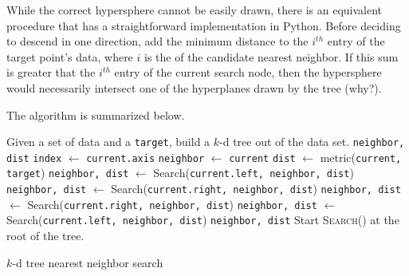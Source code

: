 While the correct hypersphere cannot be easily drawn, there is an equivalent procedure that has a straightforward implementation in Python.
Before deciding to descend in one direction, add the minimum distance to the $i^{th}$ entry of the target point's data, where $i$ is the  of the candidate nearest neighbor.
If this sum is greater that the $i^{th}$ entry of the current search node, then the hypersphere would necessarily intersect one of the hyperplanes drawn by the tree (why?).

The algorithm is summarized below.

\begin{algorithm}[h] %
\begin{algorithmic}[1]
\State Given a set of data and a \texttt{target}, build a $k$-d tree out of the data set.
    \State {} \texttt{neighbor, dist}
\EndIf
\State \texttt{index} $\gets$ \texttt{current.axis}
    \State \texttt{neighbor} $\gets$ \texttt{current}
    \State \texttt{dist} $\gets$ metric(\texttt{current, target})
\EndIf
{}
    \State \texttt{neighbor, dist} $\gets$ Search(\texttt{current.left, neighbor, dist})
        \State \texttt{neighbor, dist} $\gets$ Search(\texttt{current.right, neighbor, dist})
    \EndIf
\Else
    \State \texttt{neighbor, dist} $\gets$ Search(\texttt{current.right, neighbor, dist})
        \State \texttt{neighbor, dist} $\gets$ Search(\texttt{current.left, neighbor, dist})
    \EndIf
\EndIf
\State {} \texttt{neighbor, dist}
\EndProcedure
\State Start \textsc{Search()} at the root of the tree.
\end{algorithmic}
\caption{$k$-d tree nearest neighbor search}
\label{alg:kdneighborz}
\end{algorithm}

